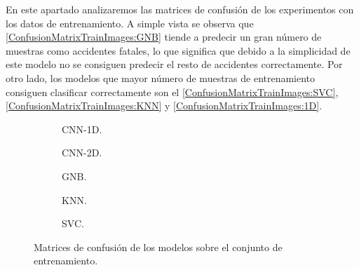     En este apartado analizaremos las matrices de confusión de los experimentos con los datos de entrenamiento. A simple vista se observa que  \eqref{ConfusionMatrixTrainImages:GNB} tiende a predecir un gran número de muestras como accidentes fatales, lo que significa que debido a la simplicidad de este modelo no se consiguen predecir el resto de accidentes correctamente. Por otro lado, los modelos que mayor número de muestras de entrenamiento consiguen clasificar correctamente son el  \eqref{ConfusionMatrixTrainImages:SVC},  \eqref{ConfusionMatrixTrainImages:KNN} y  \eqref{ConfusionMatrixTrainImages:1D}.

    \begin{figure}[H]
        \centering
        \begin{subfigure}{0.4\textwidth}
            
            \caption{CNN-1D.}
            \label{ConfusionMatrixTrainImages:1D}
        \end{subfigure}
        \hspace{1mm}
        \begin{subfigure}{0.4\textwidth}
            
            \caption{CNN-2D.} 
            \label{ConfusionMatrixTrainImages:2D}
        \end{subfigure}
        \vspace*{0.1 mm}
        \begin{subfigure}{0.4\textwidth}
            
            \caption{GNB.}
            \label{ConfusionMatrixTrainImages:GNB}
        \end{subfigure}
        \hspace{1mm}
        \begin{subfigure}{0.4\textwidth}
            
            \caption{KNN.}
            \label{ConfusionMatrixTrainImages:KNN}
        \end{subfigure}
        \vspace*{0.1 mm}
        \begin{subfigure}{1\textwidth}
            \centering
            
            \caption{SVC.}
            \label{ConfusionMatrixTrainImages:SVC}
        \end{subfigure}
        \caption{Matrices de confusión de los modelos sobre el conjunto de entrenamiento.}
        \label{ConfusionMatrixTrainImages}
     \end{figure}


